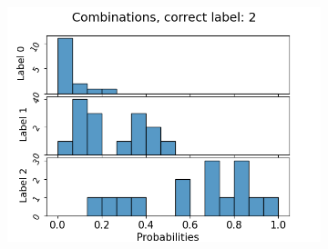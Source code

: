 \begin{figure}
\begin{subfigure}[t]{0.3\textwidth}
    \includegraphics[width=\textwidth]{files/figs/app/hists/femval/c2.png}
  \end{subfigure}


\end{figure}

